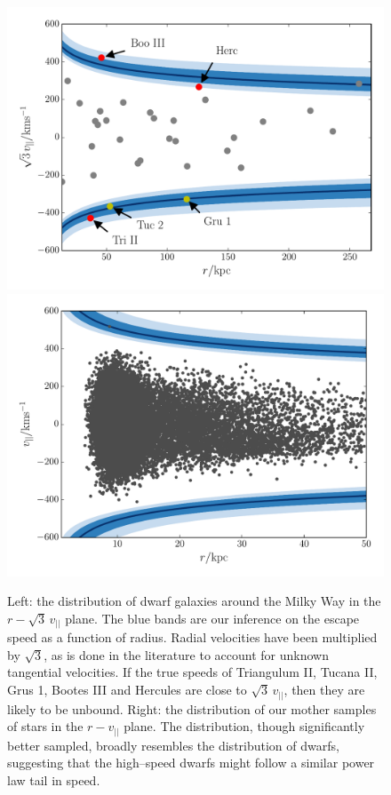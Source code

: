 \documentclass[useAMS,twocolumn,usenatbib]{mn2e}
\def\vlos{{v_{||}}}
\begin{document}
\begin{figure}
\includegraphics[width=\columnwidth]{plots/sats}\hfill 
\includegraphics[width=\columnwidth]{plots/stars_bound}\\
\caption{Left: the distribution of dwarf galaxies around the Milky Way in the $r-\sqrt{3}\,\vlos$ plane. 
The blue bands are our inference on the escape speed as a function of radius. 
Radial velocities have been multiplied by $\sqrt{3}$, as is done in the literature to account for unknown tangential velocities. 
If the true speeds of Triangulum II, Tucana II, Grus 1, Bootes III and Hercules are close to $\sqrt{3}\,\vlos$, then they are likely to be unbound.
Right: the distribution of our mother samples of stars in the $r-\vlos$ plane. 
The distribution, though significantly better sampled, broadly resembles the distribution of dwarfs, suggesting that the high--speed dwarfs might follow a similar power law tail in speed.}
\label{fig:sats}
\end{figure}
\end{document}

